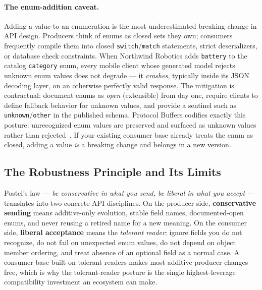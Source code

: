 \paragraph{The enum-addition caveat.}
Adding a value to an enumeration is the most underestimated breaking change
in API design. Producers think of enums as closed sets they own; consumers
frequently compile them into closed \texttt{switch}/\texttt{match} statements,
strict deserializers, or database check constraints. When Northwind Robotics
adds \texttt{battery} to the catalog \texttt{category} enum, every mobile
client whose generated model rejects unknown enum values does not degrade ---
it \emph{crashes}, typically inside its JSON decoding layer, on an otherwise
perfectly valid response. The mitigation is contractual: document enums as
\emph{open} (extensible) from day one, require clients to define fallback
behavior for unknown values, and provide a sentinel such as
\texttt{unknown}/\texttt{other} in the published schema. Protocol Buffers
codifies exactly this posture: unrecognized enum values are preserved and
surfaced as unknown values rather than rejected~\cite{protobufdocs}. If your
existing consumer base already treats the enum as closed, adding a value
\emph{is} a breaking change and belongs in a new version.

\subsection{The Robustness Principle and Its Limits}
\label{subsec:ch9-postel}

Postel's law --- \emph{be conservative in what you send, be liberal in what
you accept} --- translates into two concrete API disciplines. On the producer
side, \textbf{conservative sending} means additive-only evolution, stable
field names, documented-open enums, and never reusing a retired name for a
new meaning. On the consumer side, \textbf{liberal acceptance} means the
\emph{tolerant reader}: ignore fields you do not recognize, do not fail on
unexpected enum values, do not depend on object member ordering, and treat
absence of an optional field as a normal case. A consumer base built on
tolerant readers makes most additive producer changes free, which is why the
tolerant-reader posture is the single highest-leverage compatibility
investment an ecosystem can make.

